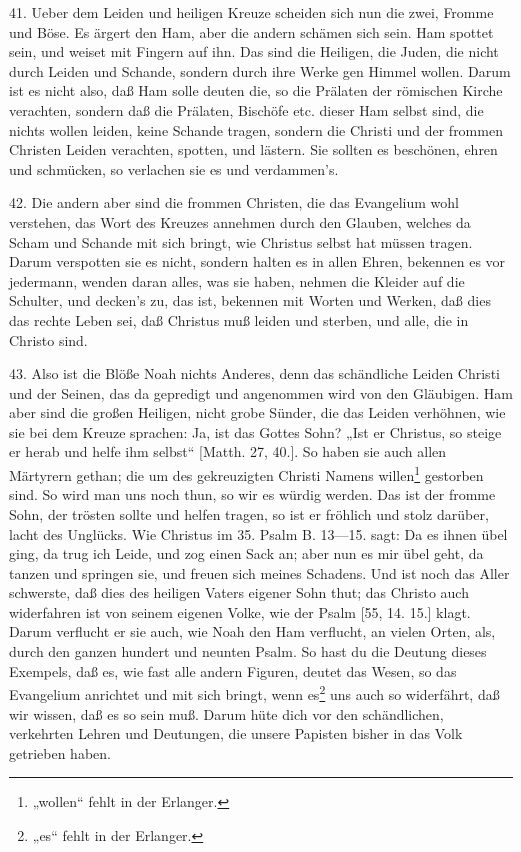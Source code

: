 41. Ueber dem Leiden und heiligen Kreuze scheiden sich nun die zwei, Fromme und Böse. Es ärgert den Ham, aber die andern schämen sich sein. Ham spottet sein, und weiset mit Fingern auf ihn. Das sind die Heiligen, die Juden, die nicht durch Leiden und Schande, sondern durch ihre Werke gen Himmel wollen. Darum ist es nicht also, daß Ham solle deuten die, so die Prälaten der römischen Kirche verachten, sondern daß die Prälaten, Bischöfe etc. dieser Ham selbst sind, die nichts wollen leiden, keine Schande tragen, sondern die Christi und der frommen Christen Leiden verachten, spotten, und lästern. Sie sollten es beschönen, ehren und schmücken, so verlachen sie es und verdammen’s.

42. Die andern aber sind die frommen Christen, die das Evangelium wohl verstehen, das Wort des Kreuzes annehmen durch den Glauben, welches da Scham und Schande mit sich bringt, wie Christus selbst hat müssen tragen. Darum verspotten sie es nicht, sondern halten es in allen Ehren, bekennen es vor jedermann, wenden daran alles, was sie haben, nehmen die Kleider auf die Schulter, und decken’s zu, das ist, bekennen mit Worten und Werken, daß dies das rechte Leben sei, daß Christus muß leiden und sterben, und alle, die in Christo sind.

43. Also ist die Blöße Noah nichts Anderes, denn das schändliche Leiden Christi und der Seinen, das da gepredigt und angenommen wird von den Gläubigen. Ham aber sind die großen Heiligen, nicht grobe Sünder, die das Leiden verhöhnen, wie sie bei dem Kreuze sprachen: Ja, ist das Gottes Sohn? „Ist er Christus, so steige er herab und helfe ihm selbst“ [Matth. 27, 40.]. So haben sie auch allen Märtyrern gethan; die um des gekreuzigten Christi Namens willen\footnote{„wollen“ fehlt in der Erlanger.} gestorben sind. So wird man uns noch thun, so wir es würdig werden. Das ist der fromme Sohn, der trösten sollte und helfen tragen, so ist er fröhlich und stolz darüber, lacht des Unglücks. Wie Christus im 35. Psalm B. 13—15. sagt: Da es ihnen übel ging, da trug ich Leide, und zog einen Sack an; aber nun es mir übel geht, da tanzen und springen sie, und freuen sich meines Schadens. Und ist noch das Aller schwerste, daß dies des heiligen Vaters eigener Sohn thut; das Christo auch widerfahren ist von seinem eigenen Volke, wie der Psalm [55, 14. 15.] klagt. Darum verflucht er sie auch, wie Noah den Ham verflucht, an vielen Orten, als, durch den ganzen hundert und neunten Psalm. So hast du die Deutung dieses Exempels, daß es, wie fast alle andern Figuren, deutet das Wesen, so das Evangelium anrichtet und mit sich bringt, wenn es\footnote{„es“ fehlt in der Erlanger.} uns auch so widerfährt, daß wir wissen, daß es so sein muß. Darum hüte dich vor den schändlichen, verkehrten Lehren und Deutungen, die unsere Papisten bisher in das Volk getrieben haben.

